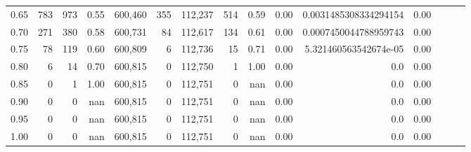 \begin{tabular}{rrrrrrrrrrrrrrr}
0.65 &      783 &     973 &  0.55 &  600,460 &      355 &  112,237 &      514 &  0.59 &  0.00 &  0.0031485308334294154 &      0.00 \\
0.70 &      271 &     380 &  0.58 &  600,731 &       84 &  112,617 &      134 &  0.61 &  0.00 &  0.0007450044788959743 &      0.00 \\
0.75 &       78 &     119 &  0.60 &  600,809 &        6 &  112,736 &       15 &  0.71 &  0.00 &  5.321460563542674e-05 &      0.00 \\
0.80 &        6 &      14 &  0.70 &  600,815 &        0 &  112,750 &        1 &  1.00 &  0.00 &                    0.0 &      0.00 \\
0.85 &        0 &       1 &  1.00 &  600,815 &        0 &  112,751 &        0 &   nan &  0.00 &                    0.0 &      0.00 \\
0.90 &        0 &       0 &   nan &  600,815 &        0 &  112,751 &        0 &   nan &  0.00 &                    0.0 &      0.00 \\
0.95 &        0 &       0 &   nan &  600,815 &        0 &  112,751 &        0 &   nan &  0.00 &                    0.0 &      0.00 \\
1.00 &        0 &       0 &   nan &  600,815 &        0 &  112,751 &        0 &   nan &  0.00 &                    0.0 &      0.00 \\
\bottomrule
\end{tabular}
